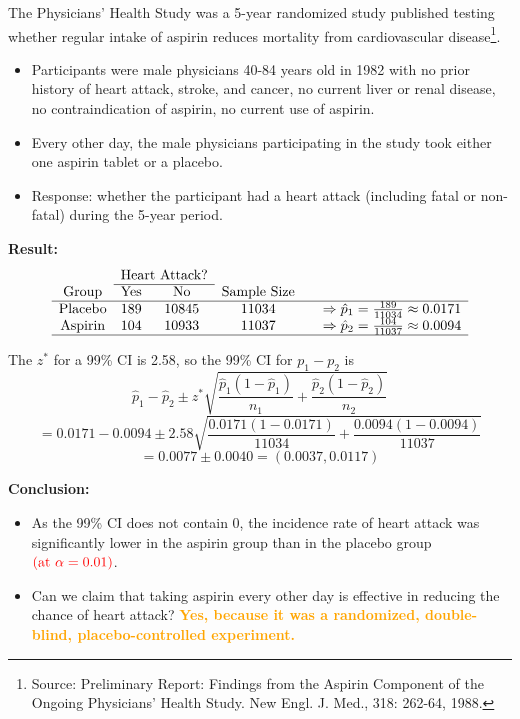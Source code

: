 \documentclass[14pt]{extarticle}
\begin{document}
The Physicians' Health Study was a 5-year randomized study published testing whether regular intake of aspirin reduces mortality from cardiovascular disease\footnote{Source: Preliminary Report: Findings from the Aspirin Component of the Ongoing Physicians' Health Study. New Engl. J. Med., 318: 262-64, 1988.}.

\begin{itemize}
    \item Participants were male physicians 40-84 years old in 1982 with no prior history of heart attack, stroke, and cancer, no current liver or renal disease, no contraindication of aspirin, no current use of aspirin.
    \item Every other day, the male physicians participating in the study took either one aspirin tablet or a placebo.
    \item Response: whether the participant had a heart attack (including fatal or non-fatal) during the 5-year period.
\end{itemize}

\textbf{Result:}
\[
\begin{array}{c c c c c }
& \multicolumn{2}{c}{\text{Heart Attack?}} & & \\
\cline{2-3}
\text{Group} & \text{Yes} & \text{No} & \text{Sample Size} & \text{ }\\
\hline
\text{Placebo} & 189 & 10845 & 11034 & \quad \Rightarrow \hat{p}_1 = \frac{189}{11034} \approx 0.0171 \\
\text{Aspirin} & 104 & 10933 & 11037 & \quad \Rightarrow \hat{p}_2 = \frac{104}{11037} \approx 0.0094 \\
\hline
\end{array}
\]

The \(z^*\) for a 99\% CI is 2.58, so the 99\% CI for \(p_1 - p_2\) is
\[
\hat{p}_1 - \hat{p}_2 \pm z^* \sqrt{\frac{\hat{p}_1(1 - \hat{p}_1)}{n_1} + \frac{\hat{p}_2(1 - \hat{p}_2)}{n_2}}
\]
\[
= 0.0171 - 0.0094 \pm 2.58 \sqrt{\frac{0.0171(1 - 0.0171)}{11034} + \frac{0.0094(1 - 0.0094)}{11037}}
\]
\[
= 0.0077 \pm 0.0040 = (0.0037, 0.0117)
\]

\textbf{Conclusion:}
\begin{itemize}
    \item As the 99\% CI does not contain 0, the incidence rate of heart attack was significantly lower in the aspirin group than in the placebo group \(\textcolor{red}{\text{(at } \alpha = 0.01\text{)}}\).
    \item Can we claim that taking aspirin every other day is effective in reducing the chance of heart attack? 
    \textcolor{orange}{\textbf{Yes, because it was a randomized, double-blind, placebo-controlled experiment.}}
\end{itemize}
\end{document}
